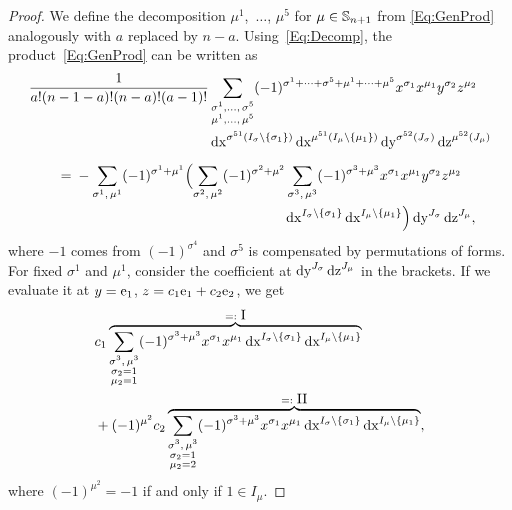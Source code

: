 \documentclass[\MainFolder/Text.tex]{subfiles}
\begin{document}
\begin{proof}
We define the decomposition $\mu^1$,~$\dotsc$, $\mu^5$ for $\mu\in \mathbb{S}_{n+1}$ from \eqref{Eq:GenProd} analogously with $a$ replaced by $n-a$. Using~\eqref{Eq:Decomp}, the product~\eqref{Eq:GenProd} can be written as
\begin{align*}
  &\begin{multlined}\frac{1}{a! (n-1-a)! (n-a)! (a-1)!} \sum_{\substack{\sigma^1,  \dotsc,\, \sigma^5 \\ \mu^1, \dotsc,\, \mu^5}} (-1)^{\sigma^1 + \dotsb + \sigma^5 + \mu^1 + \dotsb + \mu^5} x^{\sigma_1} x^{\mu_1} y^{\sigma_2} z^{\mu_2} \\ \Diff{x}^{\sigma^{51}(I_\sigma\backslash \{\sigma_1\})} \Diff{x}^{\mu^{51}(I_\mu\backslash\{\mu_1\})} \Diff{y}^{\sigma^{52}(J_\sigma)} \Diff{z}^{\mu^{52}(J_\mu)} \end{multlined} \\[5pt]
 &\qquad =\begin{multlined}[t]- \sum_{\sigma^1,\, \mu^1} (-1)^{\sigma^1 + \mu^1} \Bigl(\sum_{\sigma^2,\, \mu^2} (-1)^{\sigma^2 + \mu^2} \sum_{\sigma^3,\, \mu^3} (-1)^{\sigma^3 + \mu^3} x^{\sigma_1} x^{\mu_1} y^{\sigma_2} z^{\mu_2} \\ \Diff{x}^{I_\sigma \backslash \{\sigma_1\}} \Diff{x}^{I_\mu\backslash \{\mu_1\}}\Bigr) \Diff{y}^{J_\sigma} \Diff{z}^{J_\mu},\end{multlined} \end{align*}
where $-1$ comes from $(-1)^{\sigma^4}$ and $\sigma^5$ is compensated by permutations of forms. For fixed $\sigma^1$ and $\mu^1$, consider the coefficient at $\operatorname{dy}^{J_\sigma}\operatorname{dz}^{J_\mu}$ in the brackets. If we evaluate it at $y=\mathrm{e}_1$, $z=c_1 \mathrm{e}_1 + c_2 \mathrm{e}_2$, we get
\begin{align*}
&  c_1 \overbrace{\sum_{\substack{\sigma^3,\, \mu^3 \\ \sigma_2 = 1 \\ \mu_2 = 1}} (-1)^{\sigma^3 + \mu^3} x^{\sigma_1} x^{\mu_1}  \operatorname{dx}^{I_\sigma\backslash\{\sigma_1\}} \operatorname{dx}^{I_\mu \backslash\{\mu_1\}}}^{=:\displaystyle\mathrm{I}} \\ 
& {} + (-1)^{\mu^2} c_2  \overbrace{\sum_{\substack{\sigma^3,\, \mu^3 \\ \sigma_2 = 1 \\ \mu_2 = 2}} (-1)^{\sigma^3 + \mu^3} x^{\sigma_1} x^{\mu_1}  \operatorname{dx}^{I_\sigma\backslash\{\sigma_1\}} \operatorname{dx}^{I_\mu \backslash\{\mu_1\}}}^{=:\displaystyle\mathrm{II}},
 \end{align*}
where $(-1)^{\mu^2} = -1$ if and only if $1\in I_{\mu}$.


\end{proof}
\end{document}
